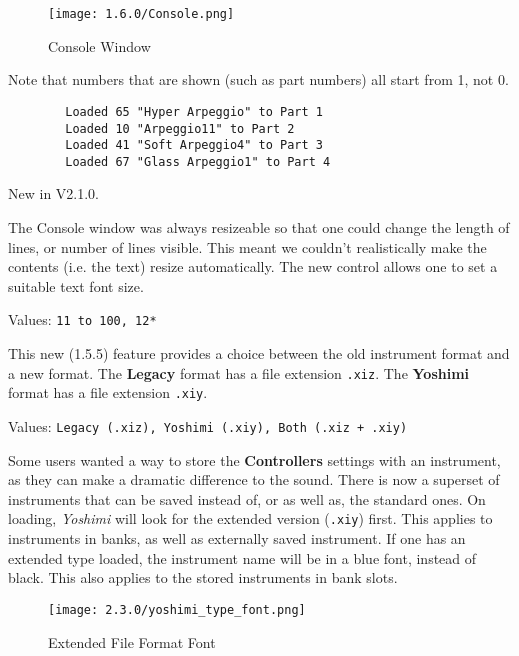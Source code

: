 \begin{figure}[H]
   \centering
   \texttt{[image: 1.6.0/Console.png]}
   \caption[Yoshimi Console Window]{Console Window}
   \label{fig:console_window}
\end{figure}

   Note that numbers that are shown (such as part numbers) all start from 1,
   not 0.

   \begin{verbatim}
        Loaded 65 "Hyper Arpeggio" to Part 1
        Loaded 10 "Arpeggio11" to Part 2
        Loaded 41 "Soft Arpeggio4" to Part 3
        Loaded 67 "Glass Arpeggio1" to Part 4
   \end{verbatim}

   New in V2.1.0.

   The Console window was always resizeable so that one could change the length
   of lines, or number of lines visible. This meant we couldn't realistically
   make the contents (i.e. the text) resize automatically. The new control allows
   one to set a suitable text font size.

   Values: \texttt{11 to 100, 12*}

   This new (1.5.5) feature provides a choice between the old instrument
   format and a new format.
   The \textbf{Legacy} format has a file extension \texttt{.xiz}.
   The \textbf{Yoshimi} format has a file extension \texttt{.xiy}.

   Values: \texttt{Legacy (.xiz), Yoshimi (.xiy), Both (.xiz + .xiy)}

   Some users wanted a way to store the \textbf{Controllers} settings
   with an instrument, as they can make a dramatic difference to the
   sound. There is now a superset of instruments that can be saved instead
   of, or as well as, the standard ones. On loading, \textsl{Yoshimi}
   will look for the extended version (\texttt{.xiy}) first.
   This applies to instruments in banks, as well as
   externally saved instrument.
   If one has an extended type loaded, the instrument
   name will be in a blue font, instead of black.
   This also applies to the stored instruments in bank slots.

\begin{figure}[H]
   \centering
   \texttt{[image: 2.3.0/yoshimi\_type\_font.png]}
   \caption[Yoshimi Font for Extended File Format]{Extended File Format Font}
   \label{fig:extended_file_format_font}
\end{figure}

